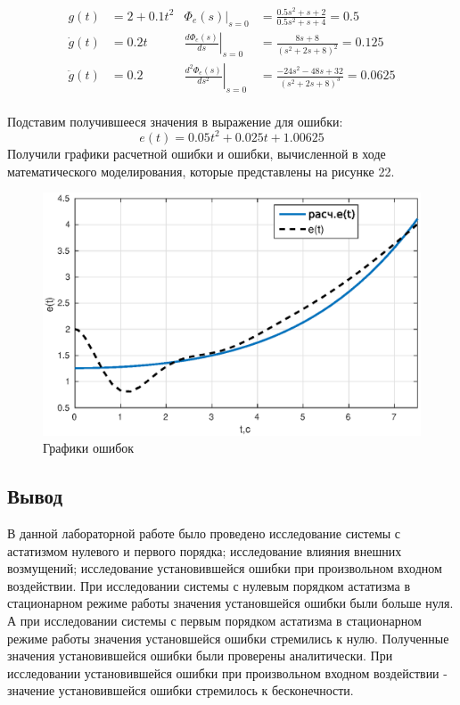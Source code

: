 \documentclass[12pt,a4paper]{article}
\begin{document}
\begin{align*}
    g(t) & = 2+0.1t^2 & \Phi_e(s)|_{s=0} & = \frac{0.5s^2+s+2}{0.5s^2+s+4}=0.5 \\
    \dot{g}(t) & = 0.2t & \left.\frac{d\Phi_e(s)}{ds}\right|_{s=0} & = \frac{8s+8}{(s^2+2s+8)^2}=0.125 \\
    \ddot{g}(t) & = 0.2 & \left.\frac{d^2\Phi_e(s)}{ds^2}\right|_{s=0} & = \frac{-24s^2-48s+32}{(s^2+2s+8)^3} = 0.0625 \\
\end{align*}\par

Подставим получившееся значения в выражение для ошибки:
\begin{equation}
e(t)=0.05t^2+0.025t+1.00625
\end{equation}
 Получили графики расчетной ошибки  и ошибки, вычисленной в ходе математического моделирования, которые представлены на рисунке 22.

\begin{figure}[H]
\centering
\includegraphics[width=\textwidth]{1/4_2e(t).eps}
\caption{Графики ошибок}
\end{figure}



\newpage
\begin{center}
\section*{Вывод} 
\end{center}

\par
В данной лабораторной работе было проведено исследование системы с астатизмом нулевого и первого порядка; 
исследование влияния внешних возмущений; исследование установившейся ошибки при произвольном входном воздействии.
При исследовании системы с нулевым порядком астатизма в стационарном режиме работы значения установшейся ошибки были больше нуля.
А при исследовании системы с первым порядком астатизма в стационарном режиме работы значения установшейся ошибки стремились к нулю.
Полученные значения установившейся ошибки были проверены аналитически. 
При исследовании установившейся ошибки при произвольном входном воздействии - значение установившейся ошибки стремилось к бесконечности.
\end{document}

